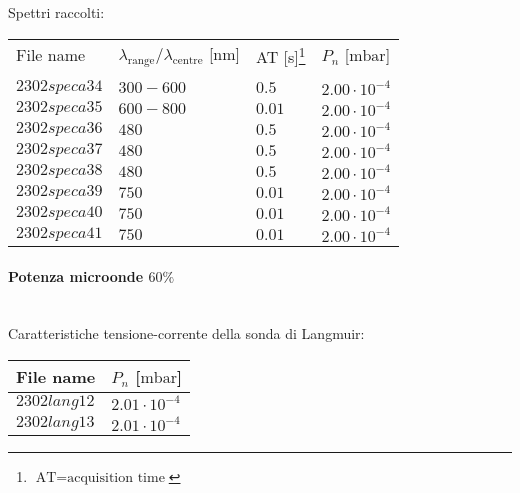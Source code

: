 Spettri raccolti:
\begin{center}
\begin{tabular}{p{3cm}p{4cm}p{2cm}p{3cm}}
\toprule
File name	&$\lambda_\text{range}\text{/}\lambda_\text{centre}$ [nm] &AT [s]\footnote{$\text{AT}=\text{acquisition time}$} &$P_{n}$ [$\si{\milli\bar}$]\\					&\\
\midrule
$2302speca34$	&$300-600$	&$0.5$		&$2.00\cdot10^{-4}$\\
$2302speca35$	&$600-800$	&$0.01$		&$2.00\cdot10^{-4}$\\
$2302speca36$	&$480$		&$0.5$		&$2.00\cdot10^{-4}$\\
$2302speca37$	&$480$		&$0.5$		&$2.00\cdot10^{-4}$\\
$2302speca38$	&$480$		&$0.5$		&$2.00\cdot10^{-4}$\\
$2302speca39$	&$750$		&$0.01$		&$2.00\cdot10^{-4}$\\
$2302speca40$	&$750$		&$0.01$		&$2.00\cdot10^{-4}$\\
$2302speca41$	&$750$		&$0.01$		&$2.00\cdot10^{-4}$\\
\bottomrule
\end{tabular}
\end{center}

\paragraph*{Potenza microonde $\text{60\%}$} ~\\
Caratteristiche tensione-corrente della sonda di Langmuir:
\begin{center}
\begin{tabular}{p{3cm}p{3cm}}
\toprule
File name	&$P_{n}$ [$\si{\milli\bar}$]\\
\midrule
$2302lang12$	&$2.01\cdot10^{-4}$\\
$2302lang13$	&$2.01\cdot10^{-4}$\\
\bottomrule
\end{tabular}
\end{center}

